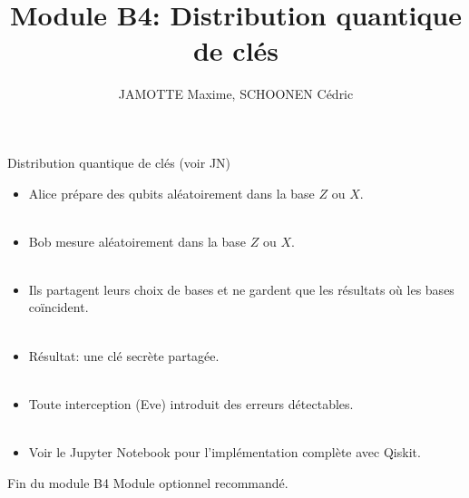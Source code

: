\documentclass[aspectratio=169,12pt]{beamer}
\title[Module B4]{Module B4: Distribution quantique de clés}
\author{JAMOTTE Maxime, SCHOONEN Cédric}
\institute{Digital Learning Hub}
\date{}
\begin{document}
\begin{frame}
  \titlepage
\end{frame}

\begin{frame}{Distribution quantique de clés (voir JN)}
  \begin{itemize}
    \setlength{\itemsep}{0.8em}
    \item Alice prépare des qubits aléatoirement dans la base $Z$ ou $X$.\\~\\
    \item Bob mesure aléatoirement dans la base $Z$ ou $X$.\\~\\
    \item Ils partagent leurs choix de bases et ne gardent que les résultats où les bases coïncident.\\~\\
    \item Résultat: une clé secrète partagée.\\~\\
    \item Toute interception (Eve) introduit des erreurs détectables.\\~\\
    \item Voir le Jupyter Notebook pour l'implémentation complète avec Qiskit.
  \end{itemize}
\end{frame}

\begin{frame}{Fin du module B4}
  \centering
  \vfill
  Module optionnel recommandé.
  \vfill
\end{frame}
\end{document}
